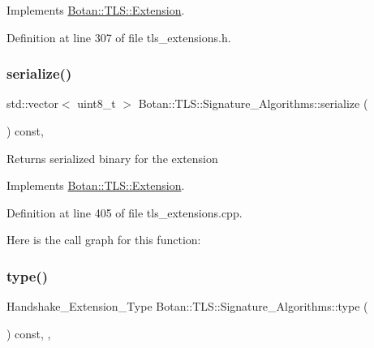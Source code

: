 Implements \mbox{\hyperlink{class_botan_1_1_t_l_s_1_1_extension_aa850b9be2322f94e7c65e583cd51acc5}{Botan\+::\+T\+L\+S\+::\+Extension}}.



Definition at line 307 of file tls\+\_\+extensions.\+h.

\mbox{\label{class_botan_1_1_t_l_s_1_1_signature___algorithms_ac94e8e1fd0adbeeb18e318ea5ce83c40}} 
\subsubsection{\texorpdfstring{serialize()}{serialize()}}
{\footnotesize\ttfamily std\+::vector$<$ uint8\+\_\+t $>$ Botan\+::\+T\+L\+S\+::\+Signature\+\_\+\+Algorithms\+::serialize (\begin{DoxyParamCaption}{ }\end{DoxyParamCaption}) const\hspace{0.3cm}{\ttfamily [override]}, {\ttfamily [virtual]}}

\begin{DoxyReturn}{Returns}
serialized binary for the extension 
\end{DoxyReturn}


Implements \mbox{\hyperlink{class_botan_1_1_t_l_s_1_1_extension_a56788726ad2526db54e5a26039cb69db}{Botan\+::\+T\+L\+S\+::\+Extension}}.



Definition at line 405 of file tls\+\_\+extensions.\+cpp.

Here is the call graph for this function\+:
\mbox{\label{class_botan_1_1_t_l_s_1_1_signature___algorithms_a9a316f000ee5c6eb181e6109bbc40b55}} 
\subsubsection{\texorpdfstring{type()}{type()}}
{\footnotesize\ttfamily Handshake\+\_\+\+Extension\+\_\+\+Type Botan\+::\+T\+L\+S\+::\+Signature\+\_\+\+Algorithms\+::type (\begin{DoxyParamCaption}{ }\end{DoxyParamCaption}) const\hspace{0.3cm}{\ttfamily [inline]}, {\ttfamily [override]}, {\ttfamily [virtual]}}

